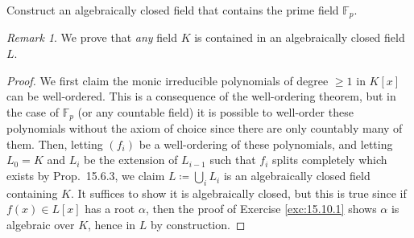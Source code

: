 \documentclass[12pt]{article}
\theoremstyle{remark}
\newtheorem*{remark}{Remark}
\begin{document}
\begin{problem}
  Construct an algebraically closed field that contains the prime field $\mathbb{F}_p$.
\end{problem}
\begin{remark}
  We prove that \emph{any} field $K$ is contained in an algebraically closed field $L$.
\end{remark}
\begin{proof}
  We first claim the monic irreducible polynomials of degree $\ge1$ in $K[x]$ can be well-ordered. This is a consequence of the well-ordering theorem, but in the case of $\mathbb{F}_p$ (or any countable field) it is possible to well-order these polynomials without the axiom of choice since there are only countably many of them. Then, letting $(f_i)$ be a well-ordering of these polynomials, and letting $L_0 = K$ and $L_i$ be the extension of $L_{i-1}$ such that $f_i$ splits completely which exists by Prop.~15.6.3, we claim $L \coloneqq \bigcup_i L_i$ is an algebraically closed field containing $K$. It suffices to show it is algebraically closed, but this is true since if $f(x) \in L[x]$ has a root $\alpha$, then the proof of Exercise \ref{exc:15.10.1} shows $\alpha$ is algebraic over $K$, hence in $L$ by construction.
\end{proof}
\end{document}
